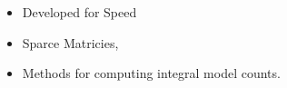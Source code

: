 
\begin{itemize}
  \item Developed for Speed
  \item Sparce Matricies, 
  \item Methods for computing integral model counts.
\end{itemize}
